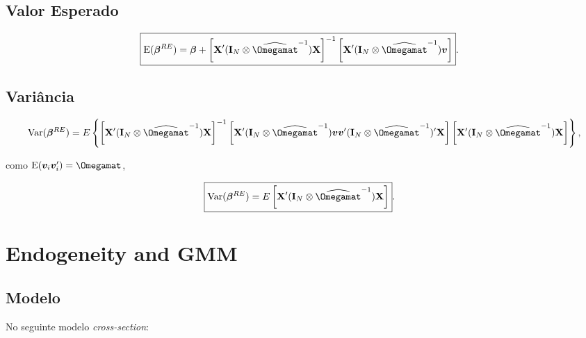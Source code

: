 \documentclass[11pt, oneside, a4paper, article]{article}
\numberwithin{equation}{section}
\begin{document}
\begin{description}
\subsection{Valor Esperado}

\vspace{-1 em}
\begin{align*}
\Aboxed{
\E( \betavec^{RE} ) = 
\betavec +
\left[ \Xmat' (\Imat_{N} \otimes \widehat{\Omegamat}^{-1}) \Xmat \right]^{-1}
\left[ \Xmat' (\Imat_{N} \otimes \widehat{\Omegamat}^{-1}) \mbs{v} \right] }.
\end{align*}

\subsection{Variância}

\vspace{-1 em}
\begin{align*} 
\Var( \betavec^{RE} ) = 
E
\left\{ 
\left[ \Xmat' ( \Imat_{N} \otimes \widehat{\Omegamat}^{-1} ) \Xmat \right]^{-1}
\left[
\Xmat' ( \Imat_{N} \otimes \widehat{\Omegamat}^{-1} )
\mbs{v} \mbs{v}'
( \Imat_{N} \otimes \widehat{\Omegamat}^{-1} )' \Xmat
\right]
\left[ \Xmat' ( \Imat_{N} \otimes \widehat{\Omegamat}^{-1} ) \Xmat \right]
\right\},
\end{align*}

\noindent
como $\E( \mbs{v}_{i} \mbs{v}_{i}' ) =\Omegamat$,

\vspace{-1 em}
\begin{align*} 
\Aboxed{
\Var( \betavec^{RE} ) = 
E
\left[ \Xmat' ( \Imat_{N} \otimes \widehat{\Omegamat}^{-1} ) \Xmat \right] }.
\end{align*}



\clearpage
\section{Endogeneity and GMM}


	\subsection{Modelo}

	No seguinte modelo \textit{cross-section}:


\end{description}
\end{document}
